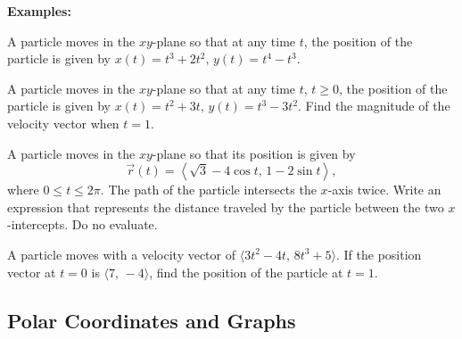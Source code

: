\documentclass[addpoints, 12pt]{exam}
\begin{document}
\noindent\textbf{Examples:}
\begin{questions}
    \question A particle moves in the $xy$-plane so that at any time $t$, the position of the particle is given by $x(t)=t^3+2t^2,\,y(t)=t^4-t^3$.


    \newpage

    \question A particle moves in the $xy$-plane so that at any time $t$, $t\ge0$, the position of the particle is given by $x(t)=t^2+3t,\,y(t)=t^3-3t^2$. Find the magnitude of the velocity vector when $t=1$.
    

    \question A particle moves in the $xy$-plane so that its position is given by \[\displaystyle\vec{r}(t)=\left\langle\sqrt{3}-4\cos t,\,1-2\sin t\right\rangle,\]where $0\le t\le2\pi$. The path of the particle intersects the $x$-axis twice. Write an expression that represents the distance traveled by the particle between the two $x$-intercepts. Do no evaluate.
    
    
    \question A particle moves with a velocity vector of $\langle3t^2-4t,\,8t^3+5\rangle.$ If the position vector at $t=0$ is $\langle7,\,-4\rangle$, find the position of the particle at $t=1$.
    
    
\end{questions}


\newpage
{}
\subsection*{Polar Coordinates and Graphs}
\end{document}
